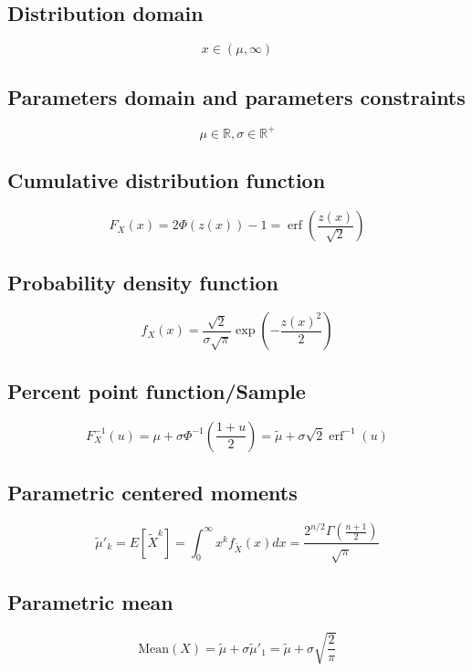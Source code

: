 \documentclass{article}
\begin{document}
\subsection{Distribution domain}
\begin{equation*} x\in\left(\mu,\infty\right) \end{equation*}
\subsection{Parameters domain and parameters constraints}
\begin{equation*} \mu\in\mathbb{R}, \sigma\in\mathbb{R}^{+} \end{equation*}
\subsection{Cumulative distribution function}
\begin{equation*} F_{X}\left(x\right)=2\Phi\left(z(x)\right)-1=\operatorname{erf}\left(\frac{z(x)}{\sqrt{2}}\right) \end{equation*}
\subsection{Probability density function}
\begin{equation*} f_{X}\left(x\right)=\frac{\sqrt{2}}{\sigma\sqrt{\pi}}\exp\left(-\frac{z(x)^2}{2}\right) \end{equation*}
\subsection{Percent point function/Sample}
\begin{equation*} F^{-1}_{X}\left(u\right)=\mu+\sigma\Phi^{-1}\left(\frac{1+u}{2}\right)=\tilde{\mu}+\sigma\sqrt{2}\operatorname{erf}^{-1}(u) \end{equation*}
\subsection{Parametric centered moments}
\begin{equation*} \tilde{\mu}'_{k}=E[\tilde{X}^k]=\int_{0}^{\infty}x^{k}f_{\tilde{X}}\left(x\right)dx=\frac{2^{n/2} \Gamma(\frac{n+1}{2})}{\sqrt{\pi}} \end{equation*}
\subsection{Parametric mean}
\begin{equation*} \mathrm{Mean}(X)=\tilde{\mu}+\sigma\tilde{\mu}'_{1}=\tilde{\mu}+\sigma\sqrt{\frac{2}{\pi}} \end{equation*}
\end{document}
